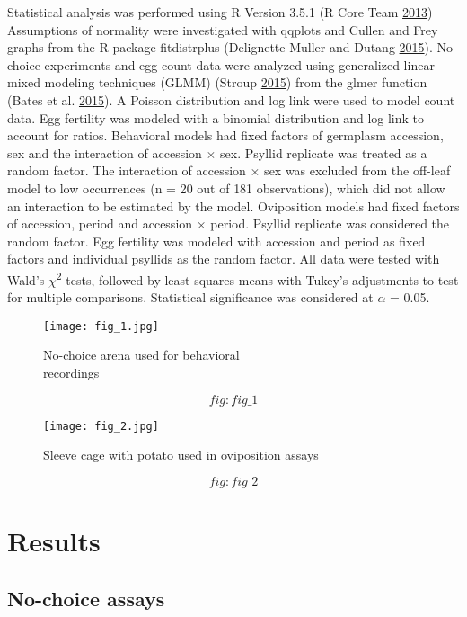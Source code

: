 \documentclass[]{article}
\begin{document}
Statistical analysis was performed using R Version 3.5.1 (R Core Team
\protect\hyperlink{ref-RCT2013}{2013}) Assumptions of normality were
investigated with qqplots and Cullen and Frey graphs from the R package
fitdistrplus (Delignette-Muller and Dutang
\protect\hyperlink{ref-Delignette-Muller2015}{2015}). No-choice
experiments and egg count data were analyzed using generalized linear
mixed modeling techniques (GLMM) (Stroup
\protect\hyperlink{ref-Stroup2015}{2015}) from the glmer function (Bates
et al. \protect\hyperlink{ref-Bates2015}{2015}). A Poisson distribution
and log link were used to model count data. Egg fertility was modeled
with a binomial distribution and log link to account for ratios.
Behavioral models had fixed factors of germplasm accession, sex and the
interaction of accession \(\times\) sex. Psyllid replicate was treated
as a random factor. The interaction of accession \(\times\) sex was
excluded from the off-leaf model to low occurrences (n = 20 out of 181
observations), which did not allow an interaction to be estimated by the
model. Oviposition models had fixed factors of accession, period and
accession \(\times\) period. Psyllid replicate was considered the random
factor. Egg fertility was modeled with accession and period as fixed
factors and individual psyllids as the random factor. All data were
tested with Wald's \(\chi\)\textsuperscript{2} tests, followed by
least-squares means with Tukey's adjustments to test for multiple
comparisons. Statistical significance was considered at \(\alpha\) =
0.05.

\begin{figure}
\centering
\texttt{[image: fig\_1.jpg]}
\caption{No-choice arena used for behavioral\\
recordings}
\end{figure}

\protect\hypertarget{fig:fig_1}{}{\[fig:fig\_1\]}

\begin{figure}
\centering
\texttt{[image: fig\_2.jpg]}
\caption{Sleeve cage with potato used in oviposition assays}
\end{figure}

\protect\hypertarget{fig:fig_2}{}{\[fig:fig\_2\]}

\hypertarget{ch:results}{%
\section{Results}\label{ch:results}}

\hypertarget{sec:results_no-choice}{%
\subsection{No-choice assays}\label{sec:results_no-choice}}
\end{document}
